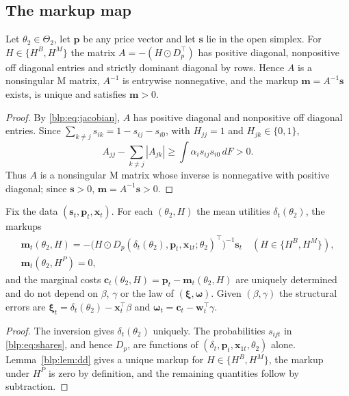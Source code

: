 \subsection{The markup map}

\begin{lemma}\label{blp:lem:dd}
Let $\theta_2\in\Theta_2$, let $\bm p$ be any price vector and let $\bm s$ lie in the open
simplex. For $H\in\{H^B,H^M\}$ the matrix $A = -(H\odot D_p^\top)$ has positive diagonal,
nonpositive off diagonal entries and strictly dominant diagonal by rows. Hence $A$ is a nonsingular
M matrix, $A^{-1}$ is entrywise nonnegative, and the markup $\bm m = A^{-1}\bm s$ exists, is unique
and satisfies $\bm m > 0$.
\end{lemma}
\begin{proof}
By \eqref{blp:eq:jacobian}, $A$ has positive diagonal and nonpositive off diagonal entries. Since $\sum_{k\neq j}s_{ik} = 1-s_{ij}-s_{i0}$, with $H_{jj}=1$ and $H_{jk}\in\{0,1\}$,
\[
A_{jj}-\sum_{k\neq j}|A_{jk}|\ge\int\alpha_i s_{ij}s_{i0}\,dF>0.
\]
Thus $A$ is a nonsingular M matrix whose inverse is nonnegative with positive diagonal; since $\bm s>0$, $\bm m=A^{-1}\bm s>0$.
\end{proof}

\begin{proposition}\label{blp:prop:markup}
Fix the data $(\bm s_t,\bm p_t,\bm x_t)$. For each $(\theta_2,H)$ the mean utilities
$\delta_t(\theta_2)$, the markups
\[
\begin{gathered}
  \bm m_t(\theta_2,H) = -\bigl(H\odot D_p(\delta_t(\theta_2),\bm p_t,\bm x_{1t};\theta_2)^\top\bigr)^{-1}\bm s_t \quad (H\in\{H^B,H^M\}),\\
  \bm m_t(\theta_2,H^P) = 0 ,
\end{gathered}
\]
and the marginal costs $\bm c_t(\theta_2,H) = \bm p_t - \bm m_t(\theta_2,H)$ are uniquely
determined and do not depend on $\beta$, $\gamma$ or the law of $(\bm\xi,\bm\omega)$. Given
$(\beta,\gamma)$ the structural errors are $\bm\xi_t = \delta_t(\theta_2) - \bm x_t^\top\beta$ and
$\bm\omega_t = \bm c_t - \bm w_t^\top\gamma$.
\end{proposition}
\begin{proof}
The inversion gives $\delta_t(\theta_2)$ uniquely. The probabilities $s_{ijt}$ in
\eqref{blp:eq:shares}, and hence $D_p$, are functions of $(\delta_t,\bm p_t,\bm x_{1t},\theta_2)$ alone.
Lemma~\ref{blp:lem:dd} gives a unique markup for $H\in\{H^B,H^M\}$, the markup under $H^P$ is zero by definition, and the remaining quantities follow by subtraction.
\end{proof}

